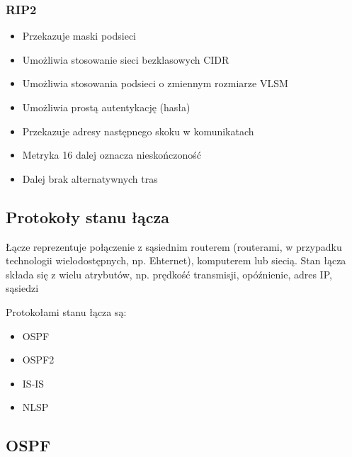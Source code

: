 \documentclass[main.tex]{subfiles}
\begin{document}
    \subsubsection{RIP2}

    \begin{itemize}
        \item Przekazuje maski podsieci
        \item Umożliwia stosowanie sieci bezklasowych CIDR
        \item Umożliwia stosowania podsieci o zmiennym rozmiarze VLSM
        \item Umożliwia prostą autentykację (hasła)
        \item Przekazuje adresy następnego skoku w komunikatach
        \item Metryka 16 dalej oznacza nieskończoność
        \item Dalej brak alternatywnych tras
    \end{itemize}

    \newpage

    \subsection{Protokoły stanu łącza}
    Łącze reprezentuje połączenie z sąsiednim routerem (routerami,
    w przypadku technologii wielodostępnych, np. Ehternet), komputerem lub siecią. Stan łącza
    składa się z wielu atrybutów, np. prędkość transmisji, opóźnienie, adres IP, sąsiedzi

    Protokołami stanu łącza są:
    \begin{itemize}
        \item OSPF
        \item OSPF2
        \item IS-IS
        \item NLSP
    \end{itemize}

    \subsection{OSPF}
\end{document}

